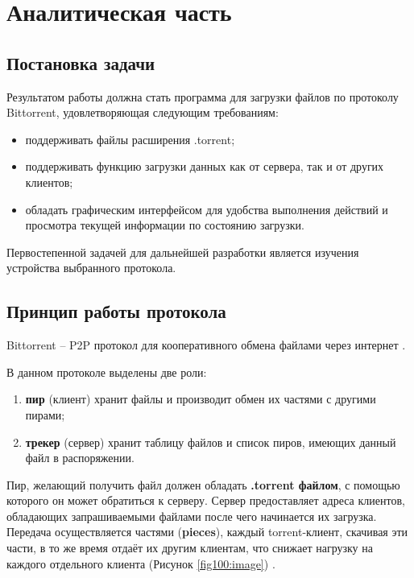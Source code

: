 \section{Аналитическая часть}

\subsection{Постановка задачи}
Результатом работы должна стать программа для загрузки файлов по протоколу Bittorrent, удовлетворяющая следующим требованиям:
\begin{itemize}
	\item поддерживать файлы расширения .torrent;
	
	\item поддерживать функцию загрузки данных как от сервера, так и от других клиентов;
	
	\item обладать графическим интерфейсом для удобства выполнения действий и просмотра текущей информации по состоянию загрузки.
	
\end{itemize}
%
Первостепенной задачей для дальнейшей разработки является изучения устройства выбранного протокола.
%
 \newline

\subsection{Принцип работы протокола}
Bittorrent -- P2P протокол для кооперативного обмена файлами через интернет \cite{doc,wiki}. 

В данном протоколе выделены две роли:
\begin{enumerate}
	\item \textbf{пир} (клиент) хранит файлы и производит обмен их частями с другими пирами;
	
	\item \textbf{трекер} (сервер) хранит таблицу файлов и список пиров, имеющих данный файл в распоряжении. \newline
\end{enumerate}

Пир, желающий получить файл должен обладать \textbf{.torrent файлом}, с помощью которого он может обратиться к серверу. Сервер предоставляет адреса клиентов, обладающих запрашиваемыми файлами после чего начинается их загрузка. Передача осуществляется частями (\textbf{pieces}), каждый torrent-клиент, скачивая эти части, в то же время отдаёт их другим клиентам, что снижает нагрузку на каждого отдельного клиента (Рисунок \ref{fig100:image}) \cite{wiki,understand}. 

